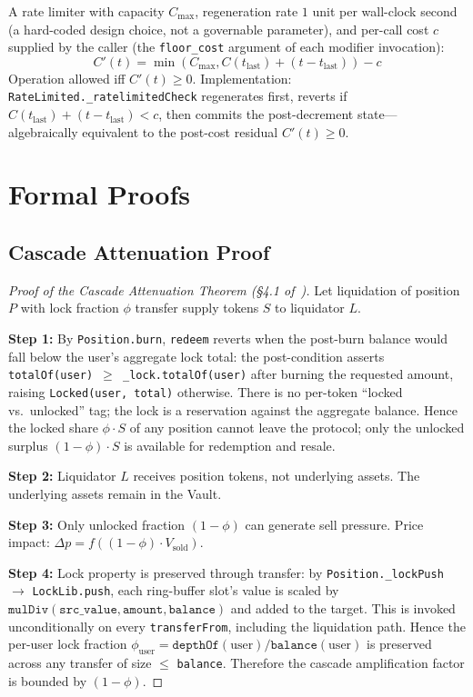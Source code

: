 \documentclass[10pt,a4paper,twocolumn]{article}
\begin{document}
\begin{definition}
A rate limiter with capacity $C_{\max}$, regeneration rate $1$ unit per wall-clock second (a hard-coded design choice, not a governable parameter), and per-call cost $c$ supplied by the caller (the \texttt{floor\_cost} argument of each modifier invocation):
\begin{equation}
C'(t) = \min\left(C_{\max}, C(t_{\text{last}}) + (t - t_{\text{last}})\right) - c
\end{equation}
Operation allowed iff $C'(t) \geq 0$. Implementation: \texttt{RateLimited.\_ratelimitedCheck} regenerates first, reverts if $C(t_{\text{last}}) + (t - t_{\text{last}}) < c$, then commits the post-decrement state---algebraically equivalent to the post-cost residual $C'(t) \geq 0$.
\end{definition}

\section{Formal Proofs}
\label{apx:proofs}

\subsection{Cascade Attenuation Proof}

\begin{proof}[Proof of the Cascade Attenuation Theorem (\S4.1 of~\cite{wp})]
Let liquidation of position $P$ with lock fraction $\phi$ transfer supply tokens $S$ to liquidator $L$.

\textbf{Step 1:} By \texttt{Position.burn}, \texttt{redeem} reverts when the post-burn balance would fall below the user's aggregate lock total: the post-condition asserts \texttt{totalOf(user) $\geq$ \_lock.totalOf(user)} after burning the requested amount, raising \texttt{Locked(user, total)} otherwise. There is no per-token ``locked vs.\ unlocked'' tag; the lock is a reservation against the aggregate balance. Hence the locked share $\phi \cdot S$ of any position cannot leave the protocol; only the unlocked surplus $(1{-}\phi) \cdot S$ is available for redemption and resale.

\textbf{Step 2:} Liquidator $L$ receives position tokens, not underlying assets. The underlying assets remain in the Vault.

\textbf{Step 3:} Only unlocked fraction $(1{-}\phi)$ can generate sell pressure. Price impact: $\Delta p = f((1{-}\phi) \cdot V_{\text{sold}})$.

\textbf{Step 4:} Lock property is preserved through transfer: by \texttt{Position.\_lockPush} $\to$ \texttt{LockLib.push}, each ring-buffer slot's value is scaled by $\texttt{mulDiv}(\texttt{src\_value}, \texttt{amount}, \texttt{balance})$ and added to the target. This is invoked unconditionally on every \texttt{transferFrom}, including the liquidation path. Hence the per-user lock fraction $\phi_{\text{user}} = \texttt{depthOf}(\text{user})/\texttt{balance}(\text{user})$ is preserved across any transfer of size $\leq$ \texttt{balance}. Therefore the cascade amplification factor is bounded by $(1{-}\phi)$.
\end{proof}
\end{document}
